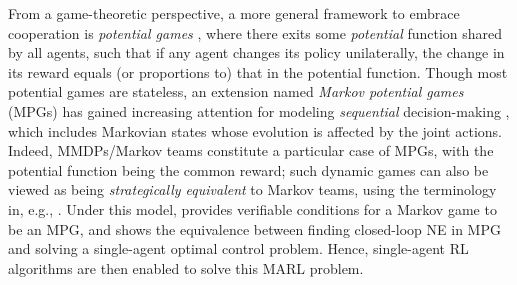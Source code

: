 


\vspace{6pt}
\vspace{3pt}

From a game-theoretic perspective, a more general framework to embrace cooperation is \emph{potential games} \cite{monderer1996potential}, where there exits some \emph{potential} function shared by all agents, such that   if any agent changes its policy unilaterally, the change in its reward equals (or proportions to) that in the potential function. Though most potential games are stateless,  an extension named \emph{Markov potential games} (MPGs)  has gained increasing attention for modeling \emph{sequential} decision-making \cite{gonzalez2013discrete,zazo2016dynamic}, which includes Markovian states whose evolution is affected   by the joint actions. 
Indeed, MMDPs/Markov teams constitute   a particular case of MPGs, with the potential function being the common reward; such dynamic games can also be viewed as being {\em strategically equivalent} to Markov teams, using the terminology in, e.g., \cite[Chapter $1$]{basar2018handbook}. Under this model, \cite{valcarcel2018learning} provides  verifiable  conditions for a Markov game to be an MPG, and shows the equivalence between  finding closed-loop  NE in MPG and solving a single-agent optimal control problem. Hence,  single-agent RL algorithms are then enabled to solve this MARL problem. 
 

\vspace{6pt}
\vspace{3pt}


